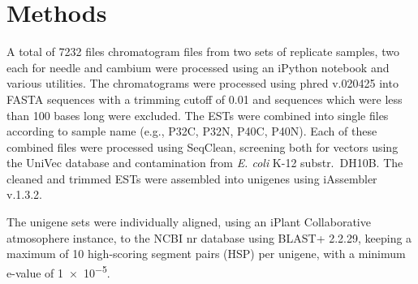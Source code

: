 \documentclass[11pt]{article}
\begin{document}
\section*{Methods}
A total of \num{7232} files chromatogram files from two sets of replicate samples, two 
each for needle and cambium were processed using an iPython notebook and various 
utilities.  The chromatograms were processed using phred v.020425 into FASTA 
sequences with a trimming cutoff of 0.01 and sequences which were less than 
100 bases long were excluded.  The ESTs were combined into single files 
according to sample name (e.g., P32C, P32N, P40C, P40N).  Each of these combined 
files were processed using SeqClean, screening both for vectors using the 
UniVec database and contamination from \textit{E. coli} K-12 substr.\ DH10B.  The 
cleaned and trimmed ESTs were assembled into unigenes using iAssembler v.1.3.2.

The unigene sets were individually aligned, using an iPlant Collaborative 
atmosophere instance, to the NCBI nr database using BLAST+ 
2.2.29, keeping a maximum of 10 high-scoring segment pairs (HSP) per unigene, 
with a minimum e-value of \num{1e-5}.   
\end{document}
